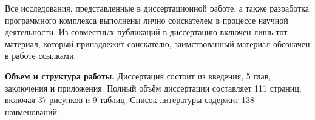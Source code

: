 {\contribution}
Все исследования, представленные в диссертационной работе, а также разработка программного комплекса выполнены лично соискателем в процессе научной деятельности. Из совместных публикаций в диссертацию включен лишь тот материал, который принадлежит соискателю, заимствованный материал обозначен в работе ссылками.

\ifsynopsis
\textbf{Объем и структура работы.} Диссертация состоит из введения, 5 глав, заключения и приложения. Полный объём диссертации составляет 111 страниц, включая 37 рисунков и 9 таблиц. Список литературы содержит 138 наименований.
\fi


